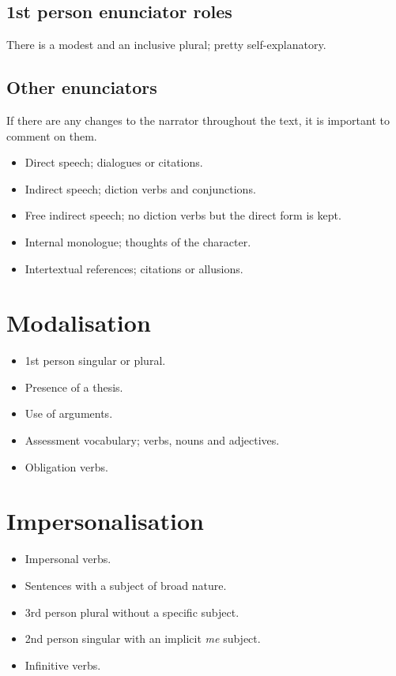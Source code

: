\documentclass{article}
\begin{document}
\subsection*{1st person enunciator roles}

There is a modest and an inclusive plural; pretty self-explanatory.

\subsection*{Other enunciators}

If there are any changes to the narrator throughout the text, it is important to
comment on them.

\begin{itemize}
    \item Direct speech; dialogues or citations.
    \item Indirect speech; diction verbs and conjunctions.
    \item Free indirect speech; no diction verbs but the direct form is kept.
    \item Internal monologue; thoughts of the character.
    \item Intertextual references; citations or allusions.
\end{itemize}

\section*{Modalisation}

\begin{itemize}
    \item 1st person singular or plural.
    \item Presence of a thesis.
    \item Use of arguments.
    \item Assessment vocabulary; verbs, nouns and adjectives.
    \item Obligation verbs.
\end{itemize}

\section*{Impersonalisation}

\begin{itemize}
    \item Impersonal verbs.
    \item Sentences with a subject of broad nature.
    \item 3rd person plural without a specific subject.
    \item 2nd person singular with an implicit \emph{me} subject.
    \item Infinitive verbs.
\end{itemize}
\end{document}
